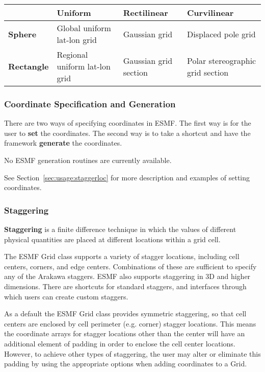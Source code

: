 \medskip
\begin{tabular}{|p{.9in}|p{1.7in}|p{1.7in}|p{1.7in}|}
\hline
 & {\bf Uniform} & {\bf Rectilinear} & {\bf Curvilinear} \\ 
\hline
{\bf Sphere} & Global uniform lat-lon grid & Gaussian grid & Displaced pole grid \\
\hline
{\bf Rectangle} & Regional uniform lat-lon grid & Gaussian grid section & Polar stereographic grid section\\
\hline
\end{tabular}

\subsubsection{Coordinate Specification and Generation}

There are two ways of specifying coordinates in ESMF.  The
first way is for the user to {\bf set} the coordinates.  The second 
way is to take a shortcut and have the framework {\bf generate}
the coordinates.  

No ESMF generation routines are currently available.

See Section~\ref{sec:usage:staggerloc} for more description and examples of
setting coordinates.

\subsubsection{Staggering}

{\bf Staggering} is a finite difference technique in which the values 
of different physical quantities are placed at different locations
within a grid cell. 

The ESMF Grid class supports a variety of stagger locations, including
cell centers, corners, and edge centers.  Combinations of these are
sufficient to specify any of the Arakawa staggers.  ESMF also supports
staggering in 3D and higher dimensions.  There are shortcuts for 
standard staggers, and interfaces through which users can create custom
staggers.

As a default the ESMF Grid class provides symmetric staggering, so
that cell centers are enclosed by cell perimeter (e.g. corner) 
stagger locations. This means the coordinate arrays for stagger
locations other than the center will have an additional element of 
padding in order to enclose the cell center locations.
However, to achieve other types of staggering, the user may alter 
or eliminate this padding by using the appropriate options when adding
coordinates to a Grid. 
 
